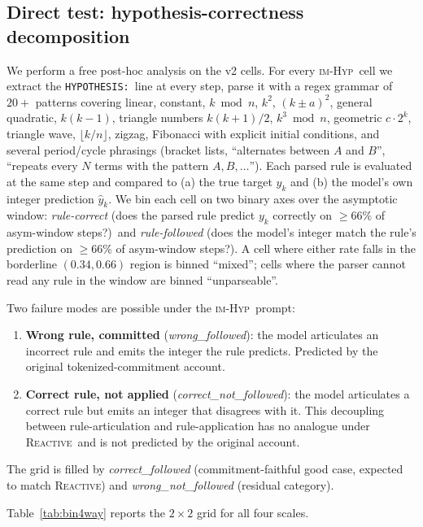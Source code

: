 \documentclass[11pt]{article}
\newcommand{\imhyp}{\textsc{im-Hyp}}
\newcommand{\reactive}{\textsc{Reactive}}
\begin{document}
\subsection{Direct test: hypothesis-correctness decomposition}
\label{sec:hyp-correctness}

We perform a free post-hoc analysis on the v2 cells.  For every
\imhyp\ cell we extract the \verb|HYPOTHESIS:|\ line at every
step, parse it with a regex grammar of $20+$ patterns covering
linear, constant, $k \bmod n$, $k^2$, $(k\pm a)^2$, general
quadratic, $k(k-1)$, triangle numbers $k(k+1)/2$, $k^3 \bmod n$,
geometric $c \cdot 2^k$, triangle wave, $\lfloor k/n \rfloor$,
zigzag, Fibonacci with explicit initial conditions, and several
period/cycle phrasings (bracket lists, ``alternates between $A$
and $B$'', ``repeats every $N$ terms with the pattern $A, B,
\dots$'').  Each parsed rule is evaluated at the same step and
compared to (a) the true target $y_k$ and (b) the model's own
integer prediction $\hat y_k$.  We bin each cell on two binary
axes over the asymptotic window:
\emph{rule-correct} (does the parsed rule predict $y_k$ correctly
on $\geq 66\%$ of asym-window steps?)\ and
\emph{rule-followed} (does the model's integer match the rule's
prediction on $\geq 66\%$ of asym-window steps?).
A cell where either rate falls in the borderline $(0.34, 0.66)$
region is binned ``mixed''; cells where the parser cannot read
any rule in the window are binned ``unparseable''.

Two failure modes are possible under the \imhyp\ prompt:
\begin{enumerate}[leftmargin=2em,itemsep=0pt,topsep=2pt]
\item \textbf{Wrong rule, committed} (\textit{wrong\_followed}):
  the model articulates an incorrect rule and emits the integer
  the rule predicts.  Predicted by the original
  tokenized-commitment account.
\item \textbf{Correct rule, not applied}
  (\textit{correct\_not\_followed}): the model articulates a
  correct rule but emits an integer that disagrees with it.  This
  decoupling between rule-articulation and rule-application has
  no analogue under \reactive\ and is not predicted by the
  original account.
\end{enumerate}
The grid is filled by \textit{correct\_followed}
(commitment-faithful good case, expected to match \reactive) and
\textit{wrong\_not\_followed} (residual category).

Table~\ref{tab:bin4way} reports the $2{\times}2$ grid for all
four scales.
\end{document}

